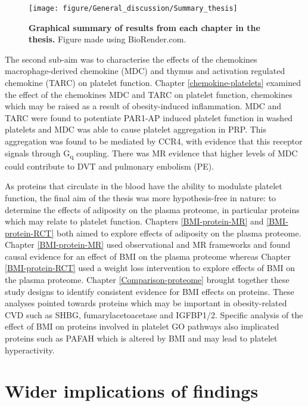 \documentclass[11pt,twoside]{bristolthesis}
\begin{document}
\begin{figure}

{\centering \texttt{[image: figure/General\_discussion/Summary\_thesis]} 

}

\caption[Graphical summary of results from each chapter in the thesis]{\textbf{Graphical summary of results from each chapter in the thesis.} Figure made using BioRender.com.}\label{fig:Thesis-schematic-results}
\end{figure}
The second sub-aim was to characterise the effects of the chemokines macrophage-derived chemokine (MDC) and thymus and activation regulated chemokine (TARC) on platelet function. Chapter \ref{chemokine-platelets} examined the effect of the chemokines MDC and TARC on platelet function, chemokines which may be raised as a result of obesity-induced inflammation. MDC and TARC were found to potentiate PAR1-AP induced platelet function in washed platelets and MDC was able to cause platelet aggregation in PRP. This aggregation was found to be mediated by CCR4, with evidence that this receptor signals through G\textsubscript{q} coupling. There was MR evidence that higher levels of MDC could contribute to DVT and pulmonary embolism (PE).

As proteins that circulate in the blood have the ability to modulate platelet function, the final aim of the thesis was more hypothesis-free in nature: to determine the effects of adiposity on the plasma proteome, in particular proteins which may relate to platelet function. Chapters \ref{BMI-protein-MR} and \ref{BMI-protein-RCT} both aimed to explore effects of adiposity on the plasma proteome. Chapter \ref{BMI-protein-MR} used observational and MR frameworks and found causal evidence for an effect of BMI on the plasma proteome whereas Chapter \ref{BMI-protein-RCT} used a weight loss intervention to explore effects of BMI on the plasma proteome. Chapter \ref{Comparison-proteome} brought together these study designs to identify consistent evidence for BMI effects on proteins. These analyses pointed towards proteins which may be important in obesity-related CVD such as SHBG, fumarylacetoacetase and IGFBP1/2. Specific analysis of the effect of BMI on proteins involved in platelet GO pathways also implicated proteins such as PAFAH which is altered by BMI and may lead to platelet hyperactivity.

\hypertarget{wider-implications-of-findings}{%
\section{Wider implications of findings}\label{wider-implications-of-findings}}
\end{document}
